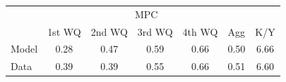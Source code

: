 \begin{tabular}{@{}lcccccc@{}} 
\toprule 
                  & \multicolumn{5}{c}{MPC} &   \\   
                  &  1st WQ  & 2nd WQ  & 3rd WQ & 4th WQ  & Agg  &  K/Y  \\  \midrule 
Model &0.28 & 0.47 & 0.59 & 0.66 & 0.50 & 6.66 \\ 
Data &0.39 & 0.39 & 0.55 & 0.66 & 0.51 & 6.60 \\ \bottomrule 
\end{tabular}  
